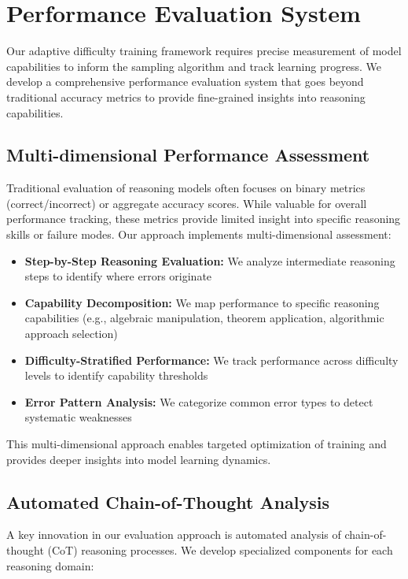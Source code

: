 \section{Performance Evaluation System}
\label{sec:performance_eval}

Our adaptive difficulty training framework requires precise measurement of model capabilities to inform the sampling algorithm and track learning progress. We develop a comprehensive performance evaluation system that goes beyond traditional accuracy metrics to provide fine-grained insights into reasoning capabilities.

\subsection{Multi-dimensional Performance Assessment}

Traditional evaluation of reasoning models often focuses on binary metrics (correct/incorrect) or aggregate accuracy scores. While valuable for overall performance tracking, these metrics provide limited insight into specific reasoning skills or failure modes. Our approach implements multi-dimensional assessment:

\begin{itemize}
    \item \textbf{Step-by-Step Reasoning Evaluation:} We analyze intermediate reasoning steps to identify where errors originate
    \item \textbf{Capability Decomposition:} We map performance to specific reasoning capabilities (e.g., algebraic manipulation, theorem application, algorithmic approach selection)
    \item \textbf{Difficulty-Stratified Performance:} We track performance across difficulty levels to identify capability thresholds
    \item \textbf{Error Pattern Analysis:} We categorize common error types to detect systematic weaknesses
\end{itemize}

This multi-dimensional approach enables targeted optimization of training and provides deeper insights into model learning dynamics.

\subsection{Automated Chain-of-Thought Analysis}

A key innovation in our evaluation approach is automated analysis of chain-of-thought (CoT) reasoning processes. We develop specialized components for each reasoning domain:

